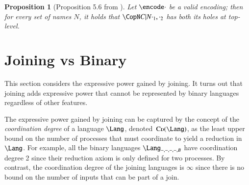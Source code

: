 \documentclass[submission,copyright,creativecommons]{eptcs}
\newtheorem{proposition}[theorem]{Proposition}
\newcommand{\cood}[1]{\,\mbox{\sc Cd}(#1)}
\begin{document}
\begin{proposition}[Proposition 5.6 from \cite{G:CONCUR08}]
\label{prop:ctx_top}
Let $\encode\cdot$ be a valid encoding; then for every set of names $N$,
it holds that $\CopN C | N {\cdot_1,\cdot_2}$ has both its holes at top-level.
\end{proposition}

\section{Joining vs Binary}
\label{sec:join_only}

This section considers the expressive power gained by joining. It turns out that joining adds expressive
power that cannot be represented by binary languages regardless of other features.

The expressive power gained by joining can be captured by the concept of the {\em coordination degree} of a language $\Lang$, denoted $\cood\Lang$,
as the least upper bound on the number of processes that must coordinate to yield a reduction in $\Lang$.
For example, all the binary languages $\Lang_{-,-,-,-,B}$ have coordination degree 2 since their
reduction axiom is only defined for two processes.
By contrast, the coordination degree of the joining languages is $\infty$ since there is no bound on the
number of inputs that can be part of a join. 
\end{document}
